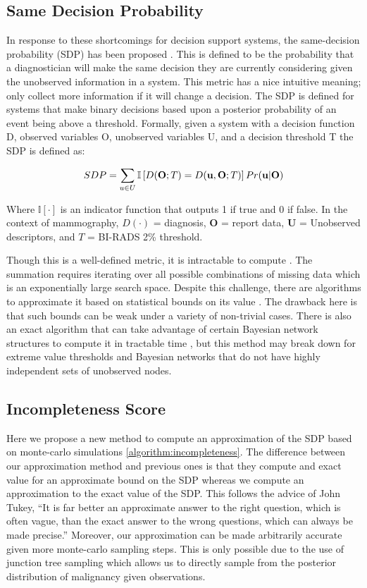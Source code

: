 \subsection{Same Decision Probability}
In response to these shortcomings for decision support systems, the same-decision probability (SDP) has been proposed \cite{Choi:2012id}. This is defined to be the probability that a diagnostician will make the same decision they are currently considering given the unobserved information in a system. This metric has a nice intuitive meaning; only collect more information if it will change a decision. The SDP is defined for systems that make binary decisions based upon a posterior probability of an event being above a threshold. Formally, given a system with a decision function D, observed variables O, unobserved variables U, and a decision threshold T the SDP is defined as:

\begin{equation}
\Large
SDP = \sum_{u \in U}\mathbb{I}\left[D(\mathbf{O};T) = D(\mathbf{u},\mathbf{O};T)\right]Pr(\mathbf{u}|\mathbf{O})
\end{equation}

Where $\mathbb{I}[\cdotp]$ is an indicator function that outputs 1 if true and 0 if false. 
In the context of mammography, $D(\cdotp)$ = diagnosis, $\mathbf{O}$ = report data, $\mathbf{U}$ = Unobserved descriptors, and $T$ = BI-RADS 2\% threshold.

Though this is a well-defined metric, it is intractable to compute \cite{Chen:2013tw}. The summation requires iterating over all possible combinations of missing data which is an exponentially large search space. Despite this challenge, there are algorithms to approximate it based on statistical bounds on its value \cite{Choi:2012id}. The drawback here is that such bounds can be weak under a variety of non-trivial cases. There is also an exact algorithm that can take advantage of certain Bayesian network structures to compute it in tractable time \cite{Chen:2013tw}, but this method may break down for extreme value thresholds and Bayesian networks that do not have highly independent sets of unobserved nodes.

\subsection{Incompleteness Score}
Here we propose a new method to compute an approximation of the SDP based on monte-carlo simulations \ref{algorithm:incompleteness}. The difference between our approximation method and previous ones\cite{Choi:2012id} is that they compute and exact value for an approximate bound on the SDP whereas we compute an approximation to the exact value of the SDP. This follows the advice of John Tukey, ``It is far better an approximate answer to the right question, which is often vague, than the exact answer to the wrong questions, which can always be made precise.'' \cite{Tukey:1962vw} Moreover, our approximation can be made arbitrarily accurate given more monte-carlo sampling steps. This is only possible due to the use of junction tree sampling which allows us to directly sample from the posterior distribution of malignancy given observations.

